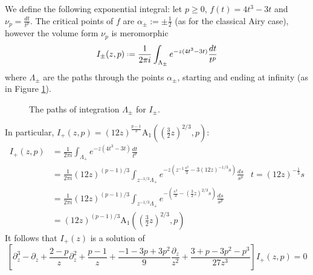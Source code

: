 \documentclass{article}
\theoremstyle{definition}
\newcommand*{\defeq}{\mathrel{\vcenter{\baselineskip0.5ex \lineskiplimit0pt
                     \hbox{\scriptsize.}\hbox{\scriptsize.}}}%
                     =}
\begin{document}
We define the following exponential integral: let $p\geq 0$, $f(t)=4t^3-3t$ and $\nu_p=\tfrac{dt}{t^p}$. The critical points of $f$ are $\alpha_{\pm}:=\pm\tfrac{1}{2}$ (as for the classical Airy case), however the volume form $\nu_p$ is meromorphic    
\begin{equation}
I_\pm(z,p)\defeq\frac{1}{2\pi i}\int_{\Lambda_{\pm}}e^{-z(4t^3-3t)}\frac{dt}{t^p}
\end{equation}
where $\Lambda_{\pm}$ are the paths through the points $\alpha_\pm$, starting and ending at infinity (as in Figure \ref{fig:path-generalized-Airy-Lambda+-}).
\begin{figure}
\center
{}
    \caption{The paths of integration $\Lambda_\pm$ for $I_{\pm}$.}\label{fig:path-generalized-Airy-Lambda+-}
\end{figure}
In particular, $I_{+}(z,p)=(12 z)^{\tfrac{p-1}{3}}\mathrm{A}_1((\tfrac{3}{2}z)^{2/3},p)$: 
\begin{align*}
I_{+}(z,p)&=\frac{1}{2\pi i}\int_{\Lambda_{+}}e^{-z(4t^3-3t)}\frac{dt}{t^p} &\\
&=\frac{1}{2\pi i}(12 z)^{(p-1)/3}\int_{z^{-1/3}\Lambda_{+}}e^{-z(z^{-1}\frac{s^3}{3}-3 (12 z)^{-1/3}s)}\frac{ds}{s^p} & t=(12 z)^{-\tfrac{1}{3}}s\\
&=\frac{1}{2\pi i}(12 z)^{(p-1)/3}\int_{z^{-1/3}\Lambda_{+}}e^{-\left(\frac{s^3}{3}-(\tfrac{3}{2} z)^{2/3}s\right)}\frac{ds}{s^p} & \\
&=(12 z)^{(p-1)/3}\mathrm{A}_1((\tfrac{3}{2}z)^{2/3},p)
\end{align*}
It follows that $I_+(z)$ is a solution of
\begin{equation}\label{eq:I}
\left[\partial_z^3-\partial_z+\frac{2-p}{z}\partial_z^2+\frac{p-1}{z}+\frac{-1-3p+3p^2}{9}\frac{\partial_z}{z^2}+\frac{3+p-3p^2-p^3}{27z^3}\right]I_+(z,p)=0
\end{equation}
\end{document}
